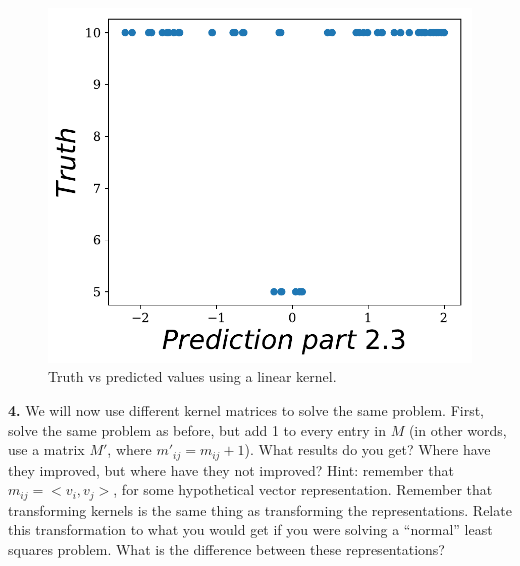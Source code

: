 \documentclass[14pt]{article}
\begin{document}
\begin{figure}[H]
\centering
\includegraphics[scale=0.5]{kernel1.pdf}
\caption{ Truth vs predicted values using a linear
kernel.\label{fig:k1}}
\end{figure}



\begin{mdframed}
\textbf{4.} We will now use different kernel matrices to solve the same problem.
First, solve the same problem as before, but add 1
to every entry in $M$ (in other words, use a matrix $M'$, where
$m'_{ij}=m_{ij}+1$). What results do you get? Where have they improved, but
where have they not improved? Hint: remember that $m_{ij}=<v_i,v_j>$, for
some hypothetical vector representation. Remember that transforming
kernels is the same thing as transforming the representations. Relate
this transformation to what you would get if you were solving a
“normal” least squares problem. What is the difference between these
representations?

\end{mdframed}
\end{document}
